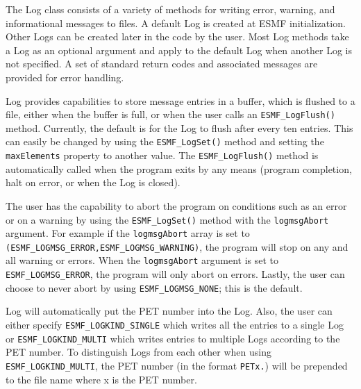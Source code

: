 


\label{sec:Log}

The Log class consists of a variety of methods for writing error, warning, and
informational messages to files.  A default Log is created at ESMF
initialization.  Other Logs can be created later in the code by the user.  Most
Log methods take a Log as an optional argument and apply to the default Log
when another Log is not specified.  A set of standard return codes and
associated messages are provided for error handling.  

Log provides capabilities to store message entries in a buffer, which is 
flushed to a file, either when the buffer is full, or when the user calls an 
{\tt ESMF\_LogFlush()} method.  Currently, the default is for the Log to flush
after every ten entries.  This can easily be changed by using the 
{\tt ESMF\_LogSet()} method and setting the {\tt maxElements} property to 
another value.  The {\tt ESMF\_LogFlush()} method is automatically called when 
the program exits by any means (program completion, halt on error, or when the
Log is closed).

The user has the capability to abort the program on conditions such as
an error or on a warning by using the {\tt ESMF\_LogSet()} method with
the {\tt logmsgAbort} argument.  For example if the  {\tt logmsgAbort} array
is set to {\tt (ESMF\_LOGMSG\_ERROR,ESMF\_LOGMSG\_WARNING)}, the program will 
stop on any and all warning or errors.  When the {\tt logmsgAbort} argument
is set to  {\tt ESMF\_LOGMSG\_ERROR}, the program will only abort on
errors.  Lastly, the user can choose to never abort by using
{\tt ESMF\_LOGMSG\_NONE}; this is the default.

Log will automatically put the PET number into the Log.  Also, the user can 
either specify {\tt ESMF\_LOGKIND\_SINGLE} which writes all the entries to a single 
Log or {\tt ESMF\_LOGKIND\_MULTI} which writes entries to multiple Logs according to 
the PET number.  To distinguish Logs from each other when using 
{\tt ESMF\_LOGKIND\_MULTI}, the PET number (in the format {\tt PETx.}) will be 
prepended to the file name where x is the PET number.

